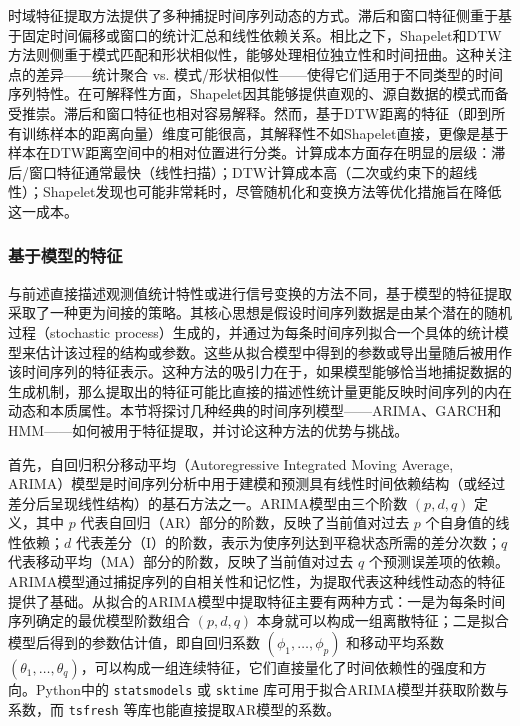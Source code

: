             时域特征提取方法提供了多种捕捉时间序列动态的方式。滞后和窗口特征侧重于基于固定时间偏移或窗口的统计汇总和线性依赖关系。相比之下，Shapelet和DTW方法则侧重于模式匹配和形状相似性，能够处理相位独立性和时间扭曲。这种关注点的差异——统计聚合 vs. 模式/形状相似性——使得它们适用于不同类型的时间序列特性。在可解释性方面，Shapelet因其能够提供直观的、源自数据的模式而备受推崇。滞后和窗口特征也相对容易解释。然而，基于DTW距离的特征（即到所有训练样本的距离向量）维度可能很高，其解释性不如Shapelet直接，更像是基于样本在DTW距离空间中的相对位置进行分类。计算成本方面存在明显的层级：滞后/窗口特征通常最快（线性扫描）；DTW计算成本高（二次或约束下的超线性）；Shapelet发现也可能非常耗时，尽管随机化和变换方法等优化措施旨在降低这一成本。
        
        \subsubsection{基于模型的特征}
        与前述直接描述观测值统计特性或进行信号变换的方法不同，基于模型的特征提取采取了一种更为间接的策略。其核心思想是假设时间序列数据是由某个潜在的随机过程（stochastic process）生成的，并通过为每条时间序列拟合一个具体的统计模型来估计该过程的结构或参数。这些从拟合模型中得到的参数或导出量随后被用作该时间序列的特征表示。这种方法的吸引力在于，如果模型能够恰当地捕捉数据的生成机制，那么提取出的特征可能比直接的描述性统计量更能反映时间序列的内在动态和本质属性。本节将探讨几种经典的时间序列模型——ARIMA、GARCH和HMM——如何被用于特征提取，并讨论这种方法的优势与挑战。

首先，自回归积分移动平均（Autoregressive Integrated Moving Average, ARIMA）模型是时间序列分析中用于建模和预测具有线性时间依赖结构（或经过差分后呈现线性结构）的基石方法之一。ARIMA模型由三个阶数 $(p, d, q)$ 定义，其中 $p$ 代表自回归（AR）部分的阶数，反映了当前值对过去 $p$ 个自身值的线性依赖；$d$ 代表差分（I）的阶数，表示为使序列达到平稳状态所需的差分次数；$q$ 代表移动平均（MA）部分的阶数，反映了当前值对过去 $q$ 个预测误差项的依赖。ARIMA模型通过捕捉序列的自相关性和记忆性，为提取代表这种线性动态的特征提供了基础。从拟合的ARIMA模型中提取特征主要有两种方式：一是为每条时间序列确定的最优模型阶数组合 $(p, d, q)$ 本身就可以构成一组离散特征；二是拟合模型后得到的参数估计值，即自回归系数 $(\phi_1, \dots, \phi_p)$ 和移动平均系数 $(\theta_1, \dots, \theta_q)$，可以构成一组连续特征，它们直接量化了时间依赖性的强度和方向。Python中的 \texttt{statsmodels} 或 \texttt{sktime} 库可用于拟合ARIMA模型并获取阶数与系数，而 \texttt{tsfresh} 等库也能直接提取AR模型的系数。

